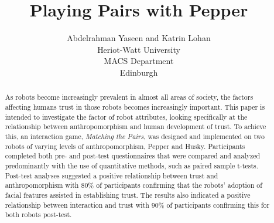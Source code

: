 \documentclass[letterpaper]{article} %
\begin{document}
\title{Playing Pairs with Pepper}
\author{ Abdelrahman Yaseen and Katrin Lohan\\
Heriot-Watt University\\
MACS Department\\
Edinburgh\\
}
\maketitle
\begin{abstract}
As robots become increasingly prevalent in almost all areas of society, the factors affecting humans trust in those robots becomes increasingly important. This paper is intended to investigate the factor of robot attributes, looking specifically at the relationship between anthropomorphism and human development of trust. To achieve this, an interaction game, \textit{Matching} \textit{the} \textit{Pairs}, was designed and implemented on two robots of varying levels of anthropomorphism, Pepper and Husky. Participants completed both pre- and post-test questionnaires that were compared and analyzed predominantly with the use of quantitative methods, such as paired sample t-tests. Post-test analyses suggested a positive relationship between trust and anthropomorphism with $80\%$ of participants confirming that the robots' adoption of facial features assisted in establishing trust. The results also indicated a positive relationship between interaction and trust with $90\%$ of participants confirming this for both robots post-test.
\end{abstract}
\end{document}
